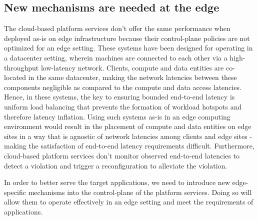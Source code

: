 \subsection{New mechanisms are needed at the edge}
The cloud-based platform services don't offer the same performance when deployed as-is on edge infrastructure because their control-plane policies are not optimized for an edge setting. These systems have been designed for operating in a datacenter setting, wherein machines are connected to each other via a high-throughput low-latency network. Clients, compute and data entities are co-located in the same datacenter, making the network latencies between these components negligible as compared to the compute and data access latencies. Hence, in these systems, the key to ensuring bounded end-to-end latency is uniform load balancing that prevents the formation of workload hotspots and therefore latency inflation. Using such systems as-is in an edge computing environment would result in the placement of compute and data entities on edge sites in a way that is agnostic of network latencies among clients and edge sites - making the satisfaction of end-to-end latency requirements difficult. Furthermore, cloud-based platform services don't monitor observed end-to-end latencies to detect a violation and trigger a reconfiguration to alleviate the violation.
\par In order to better serve the target applications, we need to introduce new edge-specific mechanisms into the control-plane of the platform services. Doing so will allow them to operate effectively in an edge setting and meet the requirements of applications.